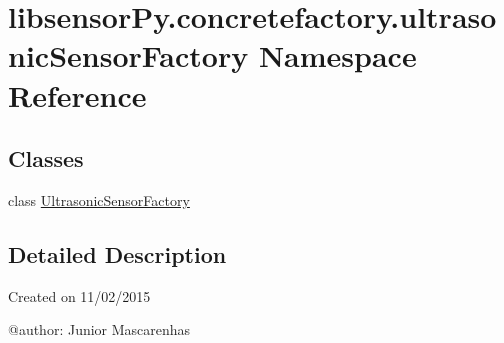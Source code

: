 \hypertarget{namespacelibsensorPy_1_1concretefactory_1_1ultrasonicSensorFactory}{}\section{libsensor\+Py.\+concretefactory.\+ultrasonic\+Sensor\+Factory Namespace Reference}
\label{namespacelibsensorPy_1_1concretefactory_1_1ultrasonicSensorFactory}
\subsection*{Classes}
\begin{DoxyCompactItemize}
\item 
class \hyperlink{classlibsensorPy_1_1concretefactory_1_1ultrasonicSensorFactory_1_1UltrasonicSensorFactory}{Ultrasonic\+Sensor\+Factory}
\end{DoxyCompactItemize}


\subsection{Detailed Description}
\begin{DoxyVerb}Created on 11/02/2015

@author: Junior Mascarenhas
\end{DoxyVerb}
 